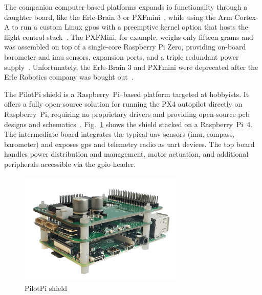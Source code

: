 The companion computer-based platforms expands \gls{io} functionality through a daughter
board, like the Erle-Brain 3 or PXFmini~\cite{ebeidUAVPlatformsSurvey2017}, while using the Arm Cortex-A to run a
custom Linux \gls{gpos} with a preemptive kernel option that hosts the flight
control stack~\cite{erle-brain}. The PXFMini, for example, weighs only fifteen
grams and was assembled on top of a single-core Raspberry Pi Zero, providing
on-board barometer and \gls{imu} sensors, expansion ports, and a triple
redundant power supply~\cite{pxfmini}. Unfortunately, the Erle-Brain 3 and PXFmini were
deprecated after the Erle Robotics company was bought out~\cite{pxfmini-deprec}.

The PilotPi shield is a Raspberry~Pi–based platform targeted at hobbyists. It
offers a fully open-source solution for running the PX4 autopilot directly on
Raspberry~Pi, requiring no proprietary drivers and providing open-source
\gls{pcb} designs and schematics~\cite{px4-pilotpi}. Fig.~\ref{fig:pilotpi}
shows the shield stacked on a Raspberry~Pi~4. The intermediate board integrates
the typical \gls{uav} sensors (\gls{imu}, compass, barometer) and exposes
\gls{gps} and telemetry radio as \gls{uart} devices. The top board handles power
distribution and management, motor actuation, and additional peripherals
accessible via the \gls{gpio} header.

\begin{figure}[!hbt]
  \centering
  \includegraphics[width=0.7\textwidth]{./img/png/rpi-pilotpi} 
  \caption[PilotPi shield]{PilotPi shield~\cite{px4-pilotpi}\footnotemark}%
  \label{fig:pilotpi}
\end{figure}


